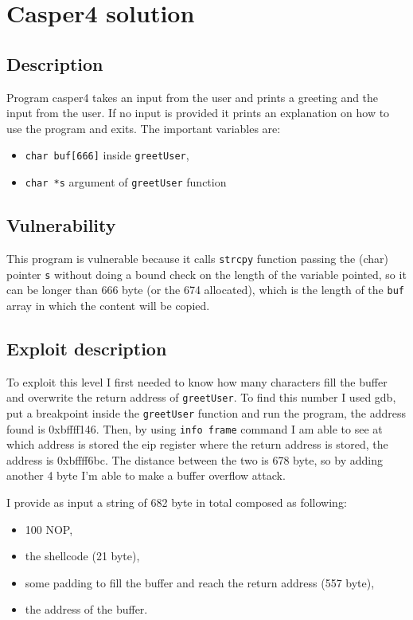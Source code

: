 \documentclass[a4paper,12pt]{article}
\begin{document}
\newpage
\section{Casper4 solution}
\subsection{Description}
Program casper4 takes an input from the user and prints a greeting and the input from the user. If no input is provided it prints an explanation on how to use the program and exits. The important variables are:
\begin{itemize}
\item \texttt{char buf[666]} inside \texttt{greetUser},
\item \texttt{char *s} argument of \texttt{greetUser} function
\end{itemize}
 

\subsection{Vulnerability}

This program is vulnerable because it calls \texttt{strcpy} function passing the (char) pointer \texttt{s} without doing a bound check on the length of the variable pointed, so it can be longer than 666 byte (or the 674 allocated), which is the length of the \texttt{buf} array in which the content will be copied.

\subsection{Exploit description}

To exploit this level I first needed to know how many characters fill the buffer and overwrite the return address of \texttt{greetUser}. To find this number I used gdb, put a breakpoint inside the \texttt{greetUser} function and run the program, the address found is 0xbffff146. Then, by using \texttt{info frame} command I am able to see at which address is stored the eip register where the return address is stored, the address is 0xbffff6bc. The distance between the two is 678 byte, so by adding another 4 byte I'm able to make a buffer overflow attack.

I provide as input a string of 682 byte in total composed as following:
\begin{itemize}
\item 100 NOP,
\item the shellcode (21 byte),
\item some padding to fill the buffer and reach the return address (557 byte),
\item the address of the buffer.
\end{itemize}
\end{document}
